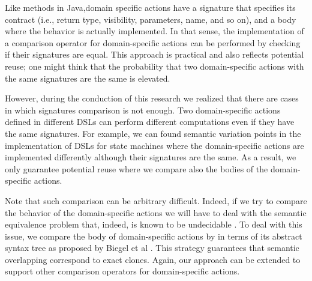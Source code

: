 Like methods in Java,domain specific actions have a signature that specifies its contract (i.e., return type, visibility, parameters, name, and so on), and a body where the behavior is actually implemented. In that sense, the implementation of a comparison operator for domain-specific actions can be performed by checking if their signatures are equal. This approach is practical and also reflects potential reuse; one might think that the probability that two domain-specific actions with the same signatures are the same is elevated.

However, during the conduction of this research we realized that there are cases in which signatures comparison is not enough. Two domain-specific actions defined in different DSLs can perform different computations even if they have the same signatures. For example, we can found semantic variation points in the implementation of DSLs for state machines where the domain-specific actions are implemented differently although their signatures are the same. As a result, we only guarantee potential reuse where we compare also the bodies of the domain-specific actions. 

Note that such comparison can be arbitrary difficult. Indeed, if we try to compare  the behavior of the domain-specific actions we will have to deal with the semantic equivalence problem that, indeed, is known to be undecidable \cite{Lucanu:2013}. To deal with this issue, we compare the body of domain-specific actions by in terms of its abstract syntax tree as proposed by Biegel et al \cite{Biegel:2010}. This strategy guarantees that semantic overlapping correspond to exact clones. Again, our approach can be extended to support other comparison operators for domain-specific actions. 


